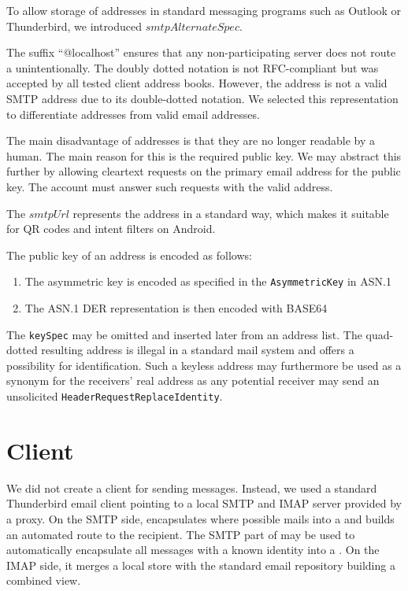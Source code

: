 To allow storage of \MessageVortex{} addresses in standard messaging programs such as Outlook or Thunderbird, we introduced $smtpAlternateSpec$. 

The suffix ``@localhost'' ensures that any non-participating server does not route a \VortexMessage{} unintentionally. The doubly dotted notation is not RFC-compliant but was accepted by all tested client address books. However, the address is not a valid SMTP address due to its double-dotted notation. We selected this representation to differentiate \MessageVortex{} addresses from valid email addresses.

The main disadvantage of \MessageVortex{} addresses is that they are no longer readable by a human. The main reason for this is the required public key. We may abstract this further by allowing cleartext requests on the primary email address for the public key. The \MessageVortex{} account must answer such requests with the valid \MessageVortex{} address.

The $smtpUrl$ represents the address in a standard way, which makes it suitable for QR codes and intent filters on Android.

The public key of an address is encoded as follows:
\begin{enumerate}
	\item The asymmetric key is encoded as specified in the \texttt{AsymmetricKey} in ASN.1
	\item The ASN.1 DER representation is then encoded with BASE64
\end{enumerate}    

The \texttt{keySpec} may be omitted and inserted later from an address list. The quad-dotted resulting address is illegal in a standard mail system and offers a possibility for identification. Such a keyless address may furthermore be used as a synonym for the receivers' real address as any potential receiver may send an unsolicited \texttt{HeaderRequestReplaceIdentity}.

\section{Client}
We did not create a \MessageVortex{} client for sending messages. Instead, we used a standard Thunderbird email client pointing to a local SMTP and IMAP server provided by a \MessageVortex{} proxy. On the SMTP side, \MessageVortex{} encapsulates where possible mails into a \VortexMessage{} and builds an automated route to the recipient. The SMTP part of \VortexMessage{} may be used to automatically encapsulate all messages with a known \MessageVortex{} identity into a \VortexMessage. On the IMAP side, it merges a local \VortexMessage{} store with the standard email repository building a combined view.

